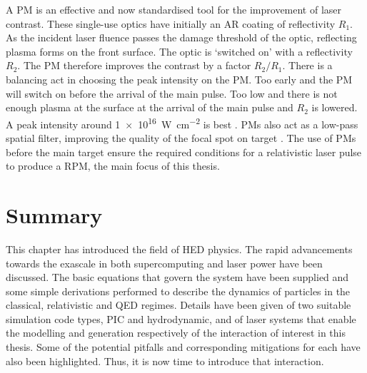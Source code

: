 A \ac{PM} is an effective and now standardised tool for the improvement of laser contrast. These single-use optics have initially an \ac{AR} coating of reflectivity $R_1$. As the incident laser fluence passes the damage threshold of the optic, reflecting plasma forms on the front surface. The optic is `switched on' with a reflectivity $R_2$. The \ac{PM} therefore improves the contrast by a factor $R_2/R_1$. There is a balancing act in choosing the peak intensity on the \ac{PM}. Too early and the PM will switch on before the arrival of the main pulse. Too low and there is not enough plasma at the surface at the arrival of the main pulse and $R_2$ is lowered. A peak intensity around \qty{1e16}{W.cm^{-2}} is best \cite{caiTimeresolvedMeasurementsReflectivity2009}. PMs also act as a low-pass spatial filter, improving the quality of the focal spot on target \cite{doumyCompleteCharacterizationPlasma2004}. The use of PMs before the main target ensure the required conditions for a relativistic laser pulse to produce a \ac{RPM}, the main focus of this thesis.

\section{Summary}
This chapter has introduced the field of HED physics. The rapid advancements towards the exascale in both supercomputing and laser power have been discussed. The basic equations that govern the system have been supplied and some simple derivations performed to describe the dynamics of particles in the classical, relativistic and QED regimes. Details have been given of two suitable simulation code types, PIC and hydrodynamic, and of laser systems that enable the modelling and generation respectively of the interaction of interest in this thesis. Some of the potential pitfalls and corresponding mitigations for each have also been highlighted. Thus, it is now time to introduce that interaction.